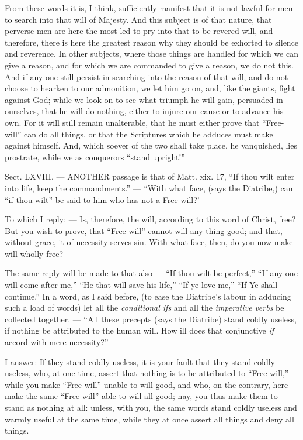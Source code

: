 From these words it is, I think, sufficiently manifest that it is not lawful for men to search into that will of Majesty. And this subject is of that nature, that perverse men are here the most led to pry into that to-be-revered will, and therefore, there is here the greatest reason why they should be exhorted to silence and reverence. In other subjects, where those things are handled for which we can give a reason, and for which we are commanded to give a reason, we do not this. And if any one still persist in searching into the reason of that will, and do not choose to hearken to our admonition, we let him go on, and, like the giants, fight against God; while we look on to see what triumph he will gain, persuaded in ourselves, that he will do nothing, either to injure our cause or to advance his own. For it will still remain unalterable, that he must either prove that “Free-will” can do all things, or that the Scriptures which he adduces must make against himself. And, which soever of the two shall take place, he vanquished, lies prostrate, while we as conquerors “stand upright!”


Sect. LXVIII. — ANOTHER passage is that of Matt. xix. 17, “If thou wilt enter into life, keep the commandments.” — “With what face, (says the Diatribe,) can “if thou wilt” be said to him who has not a Free-will?’ —

To which I reply: — Is, therefore, the will, according to this word of Christ, free? But you wish to prove, that “Free-will” cannot will any thing good; and that, without grace, it of necessity serves sin. With what face, then, do you now make will wholly free?

The same reply will be made to that also — “If thou wilt be perfect,” “If any one will come after me,” “He that will save his life,” “If ye love me,” “If Ye shall continue.” In a word, as I said before, (to ease the Diatribe’s labour in adducing such a load of words) let all the \emph{conditional ifs }and all the \emph{imperative verbs }be collected together. — “All these precepts (says the Diatribe) stand coldly useless, if nothing be attributed to the human will. How ill does that conjunctive \emph{if }accord with mere necessity?” —

I answer: If they stand coldly useless, it is your fault that they stand coldly useless, who, at one time, assert that nothing is to be attributed to “Free-will,” while you make “Free-will” unable to will good, and who, on the contrary, here make the same “Free-will” able to will all good; nay, you thus make them to stand as nothing at all: unless, with you, the same words stand coldly useless and warmly useful at the same time, while they at once assert all things and deny all things.

